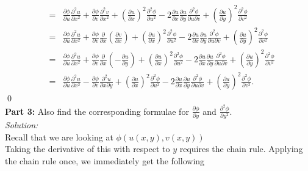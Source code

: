 \documentclass[10pt]{amsart}
\theoremstyle{nonumberplain}
\begin{document}
\begin{enumerate}[label={\bf {\arabic*}:}]
\begin{eqnarray*}
						&=& \frac{\partial\phi}{\partial u} \frac{\partial^2 u}{\partial x^2}
							+ \frac{\partial\phi}{\partial v} \frac{\partial^2 v}{\partial x^2}
							+  \left(\frac{\partial u}{\partial x}\right)^2 \frac{\partial^2 \phi}{\partial u^2}
							- 2 \frac{\partial u}{\partial x} \frac{\partial u}{\partial y} \frac{\partial^2 \phi}{\partial u \partial v}
							+  \left(\frac{\partial u}{\partial y}\right)^2\frac{\partial^2 \phi}{\partial v^2} \\
						&=& \frac{\partial\phi}{\partial u} \frac{\partial^2 u}{\partial x^2}
							+ \frac{\partial\phi}{\partial v}  \frac{\partial}{\partial x} \left(\frac{\partial v}{\partial x}\right)
							+  \left(\frac{\partial u}{\partial x}\right)^2 \frac{\partial^2 \phi}{\partial u^2}
							- 2 \frac{\partial u}{\partial x} \frac{\partial u}{\partial y} \frac{\partial^2 \phi}{\partial u \partial v}
							+  \left(\frac{\partial u}{\partial y}\right)^2\frac{\partial^2 \phi}{\partial v^2} \\
						&=& \frac{\partial\phi}{\partial u} \frac{\partial^2 u}{\partial x^2}
							+ \frac{\partial\phi}{\partial v}  \frac{\partial}{\partial x} \left(- \frac{\partial u}{\partial y}\right)
							+  \left(\frac{\partial u}{\partial x}\right)^2 \frac{\partial^2 \phi}{\partial u^2}
							- 2 \frac{\partial u}{\partial x} \frac{\partial u}{\partial y} \frac{\partial^2 \phi}{\partial u \partial v}
							+  \left(\frac{\partial u}{\partial y}\right)^2\frac{\partial^2 \phi}{\partial v^2} \\
						&=& \frac{\partial\phi}{\partial u} \frac{\partial^2 u}{\partial x^2}
							- \frac{\partial\phi}{\partial v} \frac{\partial^2 u}{\partial x \partial y}
							+  \left(\frac{\partial u}{\partial x}\right)^2 \frac{\partial^2 \phi}{\partial u^2}
							- 2 \frac{\partial u}{\partial x} \frac{\partial u}{\partial y} \frac{\partial^2 \phi}{\partial u \partial v}
							+  \left(\frac{\partial u}{\partial y}\right)^2\frac{\partial^2 \phi}{\partial v^2}.
\end{eqnarray*}
\qed \\
\noindent
\textbf{Part 3:} 
Also find the corresponding formulae for $\frac{\partial \phi}{\partial y}$ and $\frac{\partial^2 \phi }{\partial y^2}$. \\
\textit{Solution:} \\
Recall that we are looking at $\phi(u(x, y), v(x, y))$\\
Taking the derivative of this with respect to $y$ requires the chain rule.
Applying the chain rule once, we immediately get the following \\

\end{enumerate}
\end{document}
